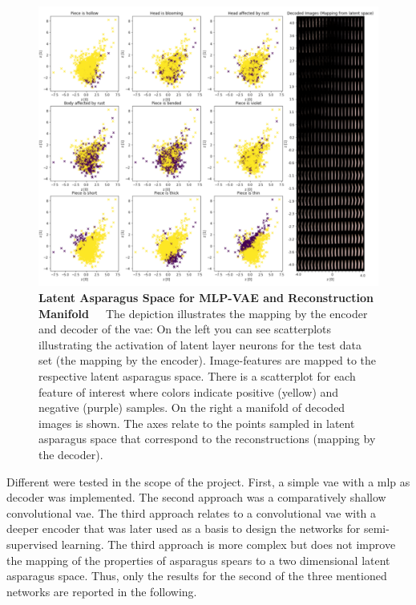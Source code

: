 \begin{figure}[h]
    \centering
    \includegraphics[scale=0.8]{Figures/chapter04/autoencoder_latent_asparagus.png}
    \decoRule
    \caption[Latent Asparagus Space for MLP-VAE and Reconstruction Manifold]{\textbf{Latent Asparagus Space for MLP-VAE and Reconstruction Manifold}~~~The depiction illustrates the mapping by the encoder and decoder of the \acrshort{vae}: On the left you can see scatterplots illustrating the activation of latent layer neurons for the test data set (the mapping by the encoder). Image-features are mapped to the respective latent asparagus space. There is a scatterplot for each feature of interest where colors indicate positive (yellow) and negative (purple) samples. On the right a manifold of decoded images is shown. The axes relate to the points sampled in latent asparagus space that correspond to the reconstructions (mapping by the decoder).}
    \label{fig:AutoencoderLatentSpace}
\end{figure}

Different  were tested in the scope of the project. First, a simple \acrshort{vae} with a \acrshort{mlp} as decoder was implemented. The second approach was a comparatively shallow convolutional \acrshort{vae}. The third approach relates to a convolutional \acrshort{vae} with a deeper encoder that was later used as a basis to design the networks for semi-supervised learning. The third approach is more complex but does not improve the mapping of the properties of asparagus spears to a two dimensional latent asparagus space. Thus, only the results for the second of the three mentioned networks are reported in the following.

